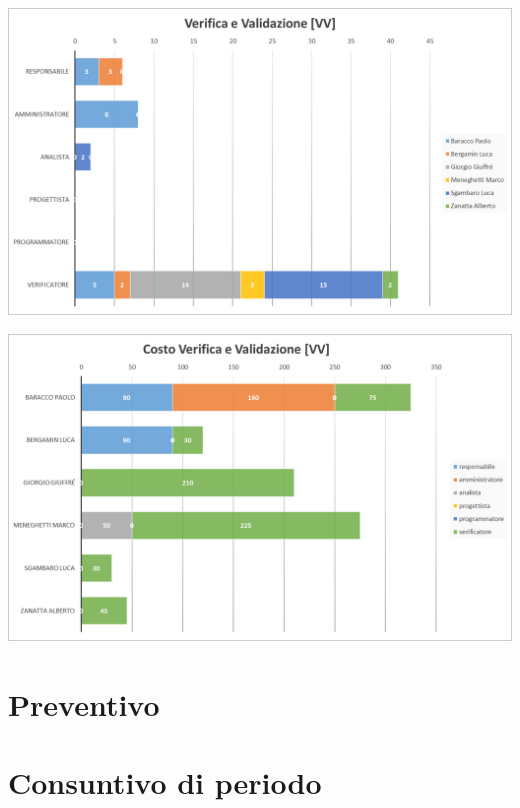 	{\includegraphics[width=15cm]{img/orevv2.png}\par}

	{\includegraphics[width=15cm]{img/costovv.png}\par}


\section{Preventivo} \label{sec:preventivo}
\section{Consuntivo di periodo} \label{sec:consuntivo}

